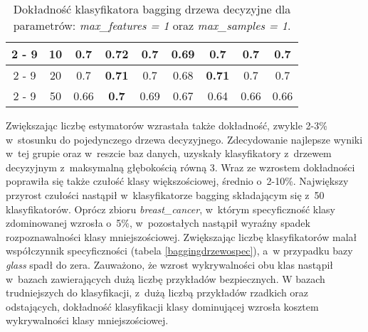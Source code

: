 \begin{table}[H]
\begin{center}
{\begin{tabular}{c|c|ccccccc}
				\cline{2%
					-%
					9}%
				&10&0.7&\textbf{0.72}&0.7&0.69&0.7&0.7&0.7\\%
				\cline{2%
					-%
					9}%
				&20&0.7&\textbf{0.71}&0.7&0.68&\textbf{0.71}&0.7&0.7\\%
				\cline{2%
					-%
					9}%
				&50&0.66&\textbf{0.7}&0.69&0.67&0.64&0.66&0.66\\%
				\hline%
			\end{tabular}}
			\caption{Dokładność klasyfikatora bagging drzewa decyzyjne dla parametrów: \textit{max\_features = 1} oraz \textit{max\_samples = 1}.}
			\label{baggingdrzewoacc}
		\end{center}
	\end{table}
Zwiększając liczbę estymatorów wzrastała także dokładność, zwykle 2-3\% w~stosunku do pojedynczego drzewa decyzyjnego. Zdecydowanie najlepsze wyniki w~tej grupie oraz w~reszcie baz danych, uzyskały klasyfikatory z~drzewem decyzyjnym z~maksymalną głębokością równą 3. Wraz ze wzrostem dokładności poprawiła się także czułość klasy większościowej, średnio o~2-10\%. Największy przyrost czułości nastąpił w~klasyfikatorze bagging składającym się z~50 klasyfikatorów. Oprócz zbioru \textit{breast\_cancer}, w~którym specyficzność klasy zdominowanej wzrosła o~5\%, w~pozostałych nastąpił wyraźny spadek rozpoznawalności klasy mniejszościowej. Zwiększając liczbę klasyfikatorów malał współczynnik specyficzności (tabela \ref{baggingdrzewospec}), a~w przypadku bazy \textit{glass} spadł do zera. Zauważono, że wzrost wykrywalności obu klas nastąpił w~bazach zawierających dużą liczbę przykładów bezpiecznych. W bazach trudniejszych do klasyfikacji, z~dużą liczbą przykładów rzadkich oraz odstających, dokładność klasyfikacji klasy dominującej wzrosła kosztem wykrywalności klasy mniejszościowej. 
